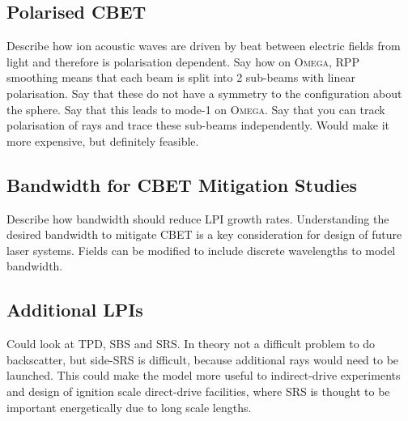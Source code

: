 \subsection{Polarised CBET}

Describe how ion acoustic waves are driven by beat between electric fields from light and therefore is polarisation dependent.
Say how on \textsc{Omega}, RPP smoothing means that each beam is split into 2 sub-beams with linear polarisation.
Say that these do not have a symmetry to the configuration about the sphere.
Say that this leads to mode-1 on \textsc{Omega}.
Say that you can track polarisation of rays and trace these sub-beams independently.
Would make it more expensive, but definitely feasible.

\subsection{Bandwidth for CBET Mitigation Studies}

Describe how bandwidth should reduce LPI growth rates.
Understanding the desired bandwidth to mitigate CBET is a key consideration for design of future laser systems.
Fields can be modified to include discrete wavelengths to model bandwidth.

\subsection{Additional LPIs}

Could look at TPD, SBS and SRS.
In theory not a difficult problem to do backscatter, but side-SRS is difficult, because additional rays would need to be launched.
This could make the model more useful to indirect-drive experiments and design of ignition scale direct-drive facilities, where SRS is thought to be important energetically due to long scale lengths.

\fi

